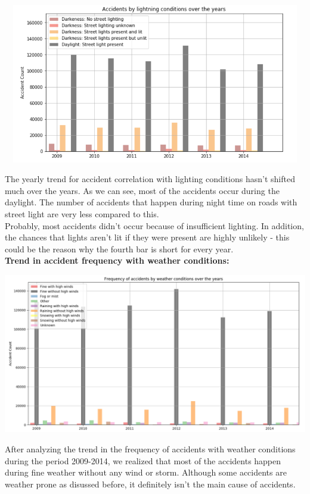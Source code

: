 \documentclass[a4paper, 10pt]{article}
\begin{document}
   \begin{center}
     \includegraphics[width=70cm,height=7cm, scale=0.4,keepaspectratio]{lighting-study.png}
   \end{center}
   The yearly trend for accident correlation with lighting conditions hasn't shifted much over the years. As we can see, most of the accidents occur during the daylight. The number of accidents that happen during night time on roads with street light are very less compared to this. \\
   Probably, most accidents didn't occur because of insufficient lighting. In addition, the chances that lights aren't lit if they were present are highly unlikely - this could be the reason why the fourth bar is short for every year. \\

   \textbf{Trend in accident frequency with weather conditions:}
   \begin{center}
     \includegraphics[width=70cm,height=7cm, scale=0.4,keepaspectratio]{weather-study.png}
   \end{center}

   After analyzing the trend in the frequency of accidents with weather conditions during the period 2009-2014, we realized that most of the accidents happen during fine weather without any wind or storm.
 Although some accidents are weather prone as disussed before, it definitely isn't the main cause of accidents. \\
   
\end{document}
